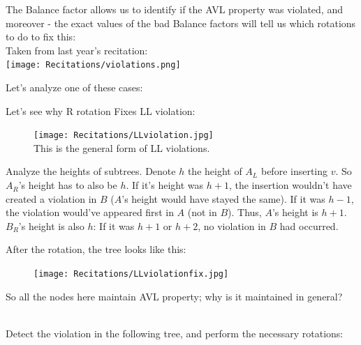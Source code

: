 
The Balance factor allows us to identify if the AVL property was violated, and moreover -
the exact values of the bad Balance factors will tell us which rotations to do to fix
this:\\
Taken from last year's recitation:\\
\texttt{[image: Recitations/violations.png]}

Let's analyze one of these cases:\\
\begin{example} Let's see why R rotation Fixes LL violation:\\
\begin{figure}[h]
  \centering
\texttt{[image: Recitations/LLviolation.jpg]}\\
This is the general form of LL violations.
\end{figure}

Analyze the heights of subtrees. Denote $h$ the height of $A_L$ before
inserting $v$. So $A_R$'s height has to also be $h$.
If it's height was $h+1$, the insertion wouldn't have created a violation in
$B$ ($A$'s height would have stayed the same). If it was $h-1$, the violation
would've appeared first in $A$ (not in $B$). Thus, $A$'s height is $h+1$.
$B_R$'s height is also $h$: If it was $h+1$ or $h+2$, no violation in $B$ had
occurred.

After the rotation, the tree looks like this:
\begin{figure}[h]
  \centering
  \texttt{[image: Recitations/LLviolationfix.jpg]}
\end{figure}
So all the nodes here maintain AVL property; why is it maintained in general?
\end{example}\\
Detect the violation in the following tree, and perform the necessary rotations:\\
